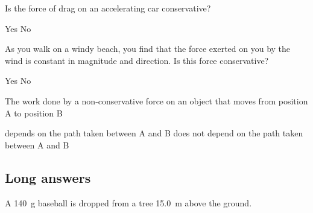 \question Is the force of drag on an accelerating car conservative?
\begin{checkboxes}
\choice Yes
\CorrectChoice No
\end{checkboxes}

\question As you walk on a windy beach, you find that the force exerted on you by the wind is constant in magnitude and direction. Is this force conservative?
\begin{checkboxes}
\CorrectChoice Yes
\choice No
\end{checkboxes}

\question The work done by a non-conservative force on an object that moves from position A to position B
\begin{checkboxes}
\CorrectChoice depends on the path taken between A and B
\choice does not depend on the path taken between A and B
\end{checkboxes}



%
%
\subsection{Long answers}
\question A \SI{140}{g} baseball is dropped from a tree \SI{15.0}{m} above the ground. 

